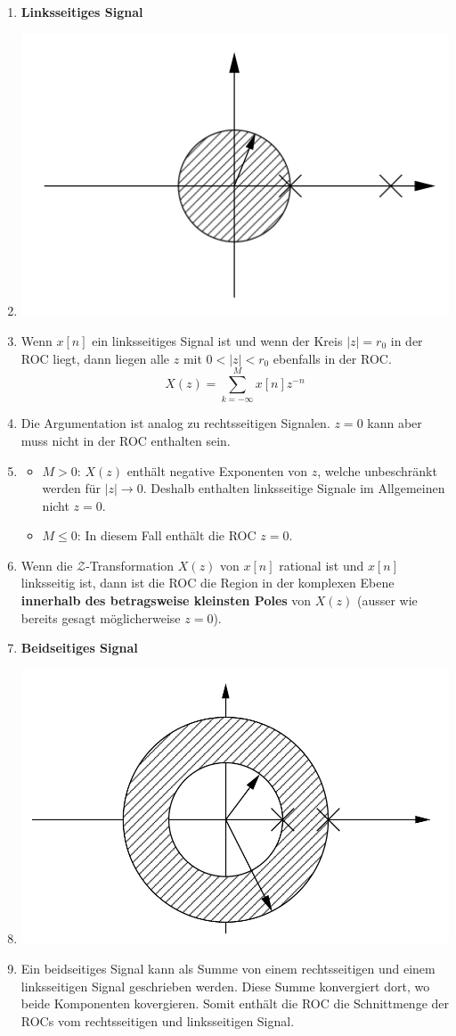 \documentclass[11pt]{article}
\begin{document}
\begin{itemize}[leftmargin = 0pt]
\begin{enumerate}
        \item \textbf{Linksseitiges Signal}
        \item[] \begin{center}
            \includegraphics[width=0.4\linewidth]{docimgs/Linksseitig.png}
        \end{center}
        \item[] Wenn $x[n]$ ein linksseitiges Signal ist und wenn der Kreis $|z| = r_0$ in der ROC liegt, dann liegen alle $z$ mit $0 < |z| < r_0$ ebenfalls in der ROC. 
        $$X(z) = \sum_{k=-\infty}^M x[n]z^{-n}$$
        \item[] Die Argumentation ist analog zu rechtsseitigen Signalen. $z=0$ kann aber muss nicht in der ROC enthalten sein.
        \item[] \begin{itemize}
            \item $M > 0$: $X(z)$ enthält negative Exponenten von $z$, welche unbeschränkt werden für $|z|\to 0$. Deshalb enthalten linksseitige Signale im Allgemeinen nicht $z=0$.
            \item $M \leq 0$: In diesem Fall enthält die ROC $z=0$.
        \end{itemize}
        \item[] Wenn die $\mathcal{Z}$-Transformation $X(z)$ von $x[n]$ rational ist und $x[n]$ linksseitig ist, dann ist die ROC die Region in der komplexen Ebene \textbf{innerhalb des betragsweise kleinsten Poles} von $X(z)$ (ausser wie bereits gesagt möglicherweise $z=0$).
        
        \item \textbf{Beidseitiges Signal}
        \item[] \begin{center}
            \includegraphics[width=0.35\linewidth]{docimgs/Beidseitig.png}
        \end{center}
        \item[] Ein beidseitiges Signal kann als Summe von einem rechtsseitigen und einem linksseitigen Signal geschrieben werden. Diese Summe konvergiert dort, wo beide Komponenten kovergieren. Somit enthält die ROC die Schnittmenge der ROCs vom rechtsseitigen und linksseitigen Signal.
        

\end{enumerate}
\end{itemize}
\end{document}
